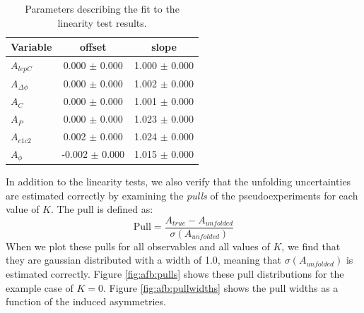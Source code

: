\begin{table}[htpb]
\begin{center}
\caption{Parameters describing the fit to the linearity test results.}
\label{tab:afb:linearity}
\begin{tabular}{l |  c  c }
\hline
Variable &  offset  &  slope \\ \hline
$A_{lepC}$       &   0.000 $\pm$ 0.000  &  1.000 $\pm$ 0.000\\ \hline
$A_{\Delta\phi}$ &   0.000 $\pm$ 0.000  &  1.002 $\pm$ 0.000\\ \hline
$A_{C}$          &   0.000 $\pm$ 0.000  &  1.001 $\pm$ 0.000\\ \hline
$A_{P}$          &   0.000 $\pm$ 0.000  &  1.023 $\pm$ 0.000\\ \hline
$A_{c1c2}$       &   0.002 $\pm$ 0.000  &  1.024 $\pm$ 0.000\\ \hline
$A_{\phi}$       &   -0.002 $\pm$ 0.000  &  1.015 $\pm$ 0.000\\ \hline
 \hline
\end{tabular}
\end{center}
\end{table}

In addition to the linearity tests, we also verify that the unfolding
uncertainties are estimated correctly by examining the \emph{pulls} of
the pseudoexperiments for each value of $K$. The pull is defined as:
\begin{equation}
\text{Pull} = \frac{A_{true} - A_{unfolded}}{\sigma(A_{unfolded})}
\end{equation}
When we plot these pulls for all observables and all values of $K$, we
find that they are gaussian distributed with a width of 1.0, meaning
that $\sigma(A_{unfolded})$ is estimated
correctly. Figure \ref{fig:afb:pulls} shows these pull
distributions for the example case of $K = 0$. Figure
\ref{fig:afb:pullwidths} shows the pull widths as a function of the
induced asymmetries.

